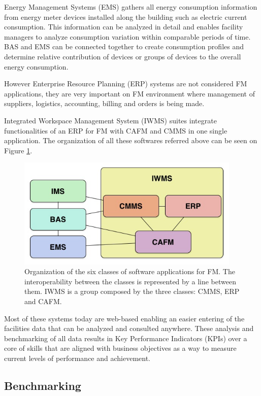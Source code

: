 Energy Management Systems (EMS) gathers all energy consumption information from energy meter devices installed along the building such as electric current consumption. This information can be analyzed in detail and enables facility managers to analyze consumption variation within comparable periods of time. BAS and EMS can be connected together to create consumption profiles and determine relative contribution of devices or groups of devices to the overall energy consumption.

However Enterprise Resource Planning (ERP) systems are not considered FM applications, they are very important on FM environment where management of suppliers, logistics, accounting, billing and orders is being made. 

Integrated Workspace Management System (IWMS) suites integrate functionalities of an ERP for FM with CAFM and CMMS in one single application. The organization of all these softwares referred above can be seen on Figure \ref{fig:ClassesFMApps}.

\begin{figure}[t!]
  \centering
  \includegraphics[width=0.95\textwidth]{img/ClassesFMApps.jpg}
  \caption{Organization of the six classes of software applications for FM. The interoperability between the classes is represented by a line between them. IWMS is a group composed by the three classes: CMMS, ERP and CAFM.}
  \label{fig:ClassesFMApps}
\end{figure}

Most of these systems today are web-based enabling an easier entering of the facilities data that can be analyzed and consulted anywhere. These analysis and benchmarking of all data results in Key Performance Indicators (KPIs) over a core of skills that are aligned with business objectives as a way to measure current levels of performance and achievement. 

\subsection{Benchmarking}

